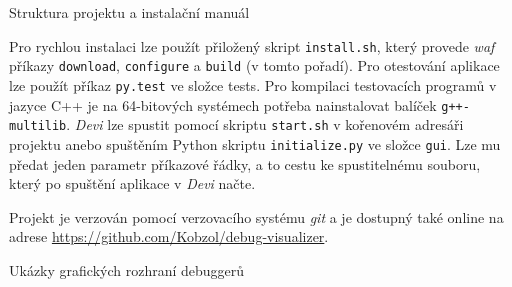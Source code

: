 \documentclass[czech,bachelor,male,python,dept460]{diploma}						%
\newcommand{\parspace}[1][]{
	\ifthenelse{\isempty{#1}}{\vspace{5mm}}{\vspace{#1}}
	\par
}
\begin{document}
\begin{section}{Struktura projektu a instalační manuál}
	\parspace Pro rychlou instalaci lze použít přiložený skript \texttt{install.sh}, který provede \textit{waf} příkazy \texttt{download}, \texttt{configure}
	a \texttt{build} (v tomto pořadí).
	Pro otestování aplikace lze použít příkaz \texttt{py.test} ve složce tests. Pro kompilaci testovacích programů v jazyce C++ je na 64-bitových systémech
	potřeba nainstalovat balíček \texttt{g++-multilib}.
	\textit{Devi} lze spustit pomocí skriptu \texttt{start.sh} v kořenovém adresáři projektu anebo spuštěním Python skriptu \texttt{initialize.py}
	ve složce \texttt{gui}. Lze mu předat jeden parametr příkazové řádky, a to cestu ke spustitelnému souboru, který po spuštění aplikace v \textit{Devi} načte.
	
	\vspace{5mm}
	
	Projekt je verzován pomocí verzovacího systému \textit{git} a je dostupný také online na adrese \url{https://github.com/Kobzol/debug-visualizer}.
\end{section}

\begin{section}{Ukázky grafických rozhraní debuggerů}
\label{appendix:gui}
\end{section}

\clearpage
\end{document}
